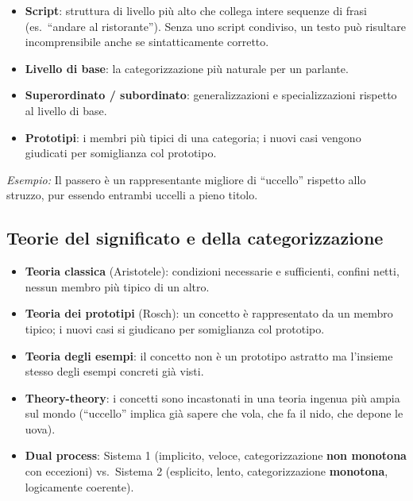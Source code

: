 \documentclass[11pt,a4paper]{article}
\newcommand{\es}[1]{\begin{esbox}\textit{Esempio:} #1\end{esbox}}
\begin{document}
\begin{itemize}
  \item \textbf{Script}: struttura di livello pi\`u alto che collega intere sequenze di frasi (es.\ ``andare al ristorante''). Senza uno script condiviso, un testo pu\`o risultare incomprensibile anche se sintatticamente corretto.
  \item \textbf{Livello di base}: la categorizzazione pi\`u naturale per un parlante.
  \item \textbf{Superordinato / subordinato}: generalizzazioni e specializzazioni rispetto al livello di base.
  \item \textbf{Prototipi}: i membri pi\`u tipici di una categoria; i nuovi casi vengono giudicati per somiglianza col prototipo.
\end{itemize}
\es{Il passero \`e un rappresentante migliore di ``uccello'' rispetto allo struzzo, pur essendo entrambi uccelli a pieno titolo.}

\subsection*{Teorie del significato e della categorizzazione}
\begin{itemize}
  \item \textbf{Teoria classica} (Aristotele): condizioni necessarie e sufficienti, confini netti, nessun membro pi\`u tipico di un altro.
  \item \textbf{Teoria dei prototipi} (Rosch): un concetto \`e rappresentato da un membro tipico; i nuovi casi si giudicano per somiglianza col prototipo.
  \item \textbf{Teoria degli esempi}: il concetto non \`e un prototipo astratto ma l'insieme stesso degli esempi concreti gi\`a visti.
  \item \textbf{Theory-theory}: i concetti sono incastonati in una teoria ingenua pi\`u ampia sul mondo (``uccello'' implica gi\`a sapere che vola, che fa il nido, che depone le uova).
  \item \textbf{Dual process}: Sistema 1 (implicito, veloce, categorizzazione \textbf{non monotona} con eccezioni) vs.\ Sistema 2 (esplicito, lento, categorizzazione \textbf{monotona}, logicamente coerente).
\end{itemize}
\end{document}
